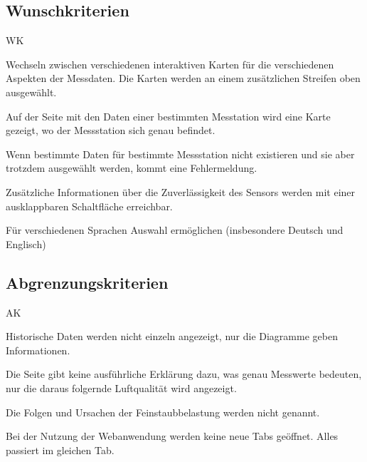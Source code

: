 \newpage
\subsection{Wunschkriterien}
\setcounter{counter}{10}
\begin{Kriterien}{WK}

	\item Wechseln zwischen verschiedenen interaktiven Karten für die verschiedenen Aspekten der Messdaten. Die Karten werden an einem zusätzlichen Streifen oben ausgewählt.

	\item Auf der Seite mit den Daten einer bestimmten Messtation wird eine Karte gezeigt, wo der Messstation sich genau befindet. 

	\item Wenn bestimmte Daten für bestimmte Messstation nicht existieren und sie aber trotzdem ausgewählt werden, kommt eine Fehlermeldung.

	\item Zusätzliche Informationen über die Zuverlässigkeit des Sensors werden mit einer ausklappbaren Schaltfläche erreichbar.

	\item Für verschiedenen Sprachen Auswahl ermöglichen (insbesondere Deutsch und Englisch)

\end{Kriterien}

\subsection{Abgrenzungskriterien}
\setcounter{counter}{10}
\begin{Kriterien}{AK}

	\item Historische Daten werden nicht einzeln angezeigt, nur die Diagramme geben Informationen.
	
	\item Die Seite gibt keine ausführliche Erklärung dazu, was  genau Messwerte bedeuten, nur die daraus folgernde Luftqualität wird angezeigt. 
	
	\item Die Folgen und Ursachen der Feinstaubbelastung werden nicht genannt.
	
	\item Bei der Nutzung der Webanwendung werden keine neue Tabs geöffnet. Alles passiert im gleichen Tab.
	
\end{Kriterien}
